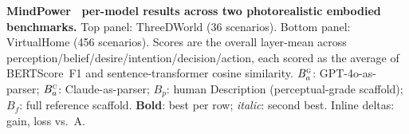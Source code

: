 \begin{table}[t]
\caption{\textbf{MindPower~\cite{zhang2025mindpower} per-model results across two photorealistic embodied benchmarks.} Top panel: ThreeDWorld (36 scenarios). Bottom panel: VirtualHome (456 scenarios). Scores are the overall layer-mean across perception/belief/desire/intention/decision/action, each scored as the average of BERTScore~F1 and sentence-transformer cosine similarity. $B_a^{\textsc{g}}$: GPT-4o-as-parser; $B_a^{\textsc{c}}$: Claude-as-parser; $B_p$: human Description (perceptual-grade scaffold); $B_f$: full reference scaffold. \textbf{Bold}: best per row; \emph{italic}: second best. Inline deltas:  gain,  loss vs.\ A.}
\label{tab:mindpower}

\centering
\footnotesize
\setlength{\tabcolsep}{3pt}
\renewcommand{\arraystretch}{1.08}


\end{table}
